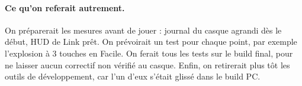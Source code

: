 \documentclass[11pt,a4paper]{article}
\begin{document}
\paragraph{Ce qu'on referait autrement.} On préparerait les mesures avant de jouer : journal du casque
agrandi dès le début, HUD de Link prêt. On prévoirait un test pour chaque point, par exemple
l'explosion à 3 touches en Facile. On ferait tous les tests sur le build final, pour ne laisser aucun
correctif non vérifié au casque. Enfin, on retirerait plus tôt les outils de développement, car l'un
d'eux s'était glissé dans le build PC.
\end{document}
